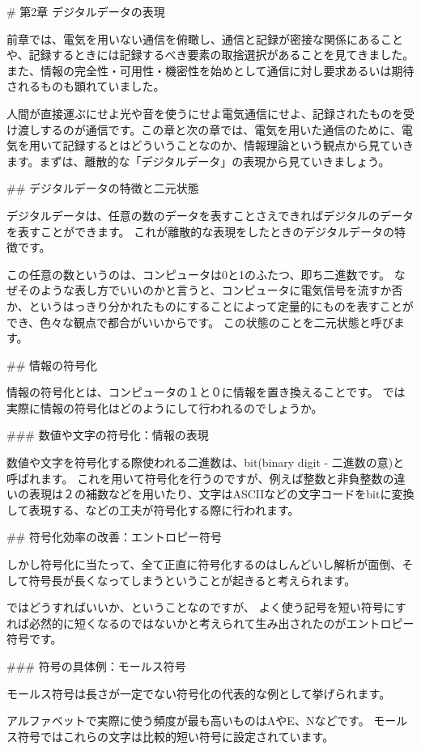 # 第2章 デジタルデータの表現

前章では、電気を用いない通信を俯瞰し、通信と記録が密接な関係にあることや、記録するときには記録するべき要素の取捨選択があることを見てきました。また、情報の完全性・可用性・機密性を始めとして通信に対し要求あるいは期待されるものも顕れていました。

人間が直接運ぶにせよ光や音を使うにせよ電気通信にせよ、記録されたものを受け渡しするのが通信です。この章と次の章では、電気を用いた通信のために、電気を用いて記録するとはどういうことなのか、情報理論という観点から見ていきます。まずは、離散的な「デジタルデータ」の表現から見ていきましょう。

## デジタルデータの特徴と二元状態

デジタルデータは、任意の数のデータを表すことさえできればデジタルのデータを表すことができます。
これが離散的な表現をしたときのデジタルデータの特徴です。

この任意の数というのは、コンピュータは0と1のふたつ、即ち二進数です。
なぜそのような表し方でいいのかと言うと、コンピュータに電気信号を流すか否か、というはっきり分かれたものにすることによって定量的にものを表すことができ、色々な観点で都合がいいからです。
この状態のことを二元状態と呼びます。

## 情報の符号化

情報の符号化とは、コンピュータの１と０に情報を置き換えることです。
では実際に情報の符号化はどのようにして行われるのでしょうか。

### 数値や文字の符号化：情報の表現

数値や文字を符号化する際使われる二進数は、bit(binary digit - 二進数の意)と呼ばれます。
これを用いて符号化を行うのですが、例えば整数と非負整数の違いの表現は２の補数などを用いたり、文字はASCIIなどの文字コードをbitに変換して表現する、などの工夫が符号化する際に行われます。

## 符号化効率の改善：エントロピー符号

しかし符号化に当たって、全て正直に符号化するのはしんどいし解析が面倒、そして符号長が長くなってしまうということが起きると考えられます。

ではどうすればいいか、ということなのですが、
よく使う記号を短い符号にすれば必然的に短くなるのではないかと考えられて生み出されたのがエントロピー符号です。

### 符号の具体例：モールス符号

モールス符号は長さが一定でない符号化の代表的な例として挙げられます。

アルファベットで実際に使う頻度が最も高いものはAやE、Nなどです。
モールス符号ではこれらの文字は比較的短い符号に設定されています。

